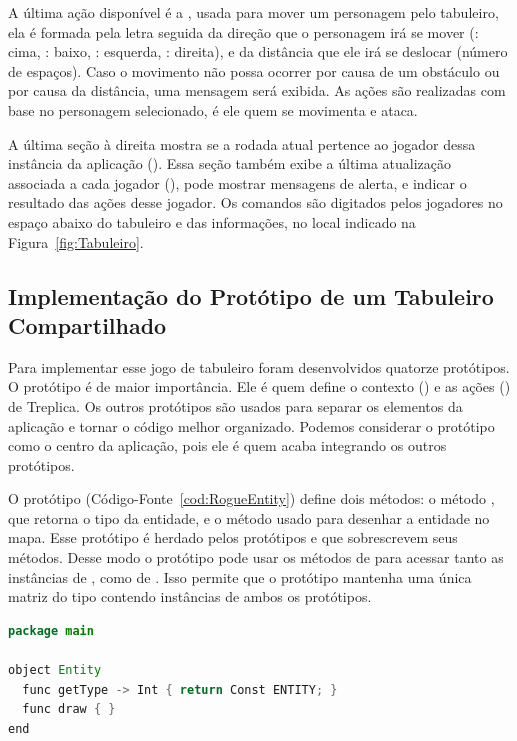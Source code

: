 A última ação disponível é a , usada para mover um personagem pelo tabuleiro, ela é formada pela letra  seguida da direção que o personagem irá se mover (: cima, : baixo, : esquerda, : direita), e da distância que ele irá se deslocar (número de espaços).  Caso o movimento não possa ocorrer por causa de um obstáculo ou por causa da distância, uma mensagem será exibida. As ações são realizadas com base no personagem selecionado, é ele quem se movimenta e ataca.

A última seção à direita mostra se a rodada atual pertence ao jogador dessa instância da aplicação (). Essa seção também exibe a última atualização associada a cada jogador (), pode mostrar mensagens de alerta, e indicar o resultado das ações desse jogador. Os comandos são digitados pelos jogadores no espaço abaixo do tabuleiro e das informações, no local indicado na Figura~\ref{fig:Tabuleiro}.

\subsection{Implementação do Protótipo de um Tabuleiro Compartilhado}

Para implementar esse jogo de tabuleiro foram desenvolvidos quatorze protótipos. O protótipo  é de maior importância. Ele é quem define o contexto () e as ações () de Treplica. Os outros protótipos são usados para separar os elementos da aplicação e tornar o código melhor organizado. Podemos considerar o protótipo  como o centro da aplicação, pois ele é quem acaba integrando os outros protótipos. 

O protótipo  (Código-Fonte~\ref{cod:RogueEntity}) define dois métodos: o método , que retorna o tipo da entidade, e o método  usado para desenhar a entidade no mapa. Esse protótipo é herdado pelos protótipos  e  que sobrescrevem seus métodos. Desse modo o protótipo  pode usar os métodos de  para acessar tanto as instâncias de , como de . Isso permite que o protótipo  mantenha uma única matriz do tipo  contendo instâncias de ambos os protótipos.

\begin{lstlisting}[language=Java, caption={Protótipo \textbf{Entity} herdado por \emph{Figure} e \emph{Tile}}, label={cod:RogueEntity}]
package main

object Entity
  func getType -> Int { return Const ENTITY; }
  func draw { }
end
\end{lstlisting}

